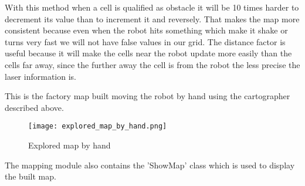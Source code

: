 With this method when a cell is qualified as obstacle it will be 10 times harder to decrement its value than to increment it and reversely.
That makes the map more consistent because even when the robot hits something which make it shake or turns very fast we will not have false values in our grid.
The distance factor is useful because it will make the cells near the robot update more easily than the cells far away, since the further away the cell is from the robot the less precise the laser information is.

This is the factory map built moving the robot by hand using the cartographer described above.

\begin{figure}[h]
    \centering\texttt{[image: explored\_map\_by\_hand.png]}
    \label{fig:explored_map_by_hand}
    \caption{Explored map by hand}
\end{figure}

The mapping module also contains the 'ShowMap' class which is used to display the built map.
